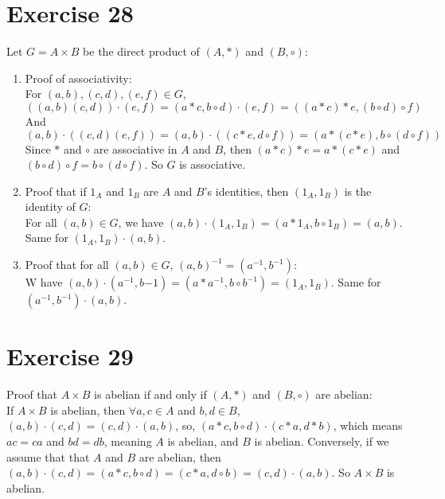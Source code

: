 \documentclass{article}
\begin{document}
    \section*{Exercise 28}
    Let $G = A \times B$ be the direct product of $(A, \ast)$ and $(B, \circ)$:
    \begin{enumerate}[label=\textbf{\alph*.}]
        \item 
            Proof of associativity: \\
            For $(a, b), (c, d), (e, f) \in G$,
            \[((a, b)(c, d)) \cdot (e, f)
            = (a \ast c, b \circ d) \cdot (e, f)
            = ((a \ast c) \ast e, (b \circ d) \circ f)\]
            And \[(a, b) \cdot ((c, d)(e, f))
            = (a, b) \cdot ((c \ast e, d \circ f))
            = (a \ast (c \ast e), b \circ (d \circ f))\]
            Since $\ast$ and $\circ$ are associative in $A$ and $B$,
            then $(a \ast c) \ast e = a \ast (c \ast e)$
            and $(b \circ d) \circ f = b \circ (d \circ f)$.
            So $G$ is associative.
        \item     
            Proof that if $1_A$ and $1_B$ are $A$ and $B$'s identities,
            then $(1_A, 1_B)$ is the identity of $G$: \\
            For all $(a, b) \in G$,
            we have $(a, b) \cdot (1_A, 1_B)
            = (a \ast 1_A, b \circ 1_B)
            = (a, b)$.
            Same for $(1_A, 1_B) \cdot (a, b)$.
        \item 
            Proof that for all $(a, b) \in G$,
            $(a, b)^{-1} = (a^{-1}, b^{-1})$: \\
            W have $(a, b) \cdot (a^{-1}, b{-1})
            = (a \ast a^{-1}, b \circ b^{-1})
            = (1_A, 1_B)$.
            Same for $(a^{-1}, b^{-1}) \cdot (a, b)$.
    \end{enumerate}


    \section*{Exercise 29}
    Proof that $A \times B$ is abelian
    if and only if $(A, \ast)$ and $(B, \circ)$ are abelian: \\
    If $A \times B $ is abelian,
    then $\forall a, c \in A$ and $b, d \in B$,
    $(a, b) \cdot (c, d) = (c, d) \cdot (a, b)$,
    so, $(a \ast c, b \circ d) \cdot (c \ast a, d \ast b)$,
    which means $ac = ca$ and $bd = db$,
    meaning $A$ is abelian, and $B$ is abelian.
    Conversely, if we assume that that $A$ and $B$ are abelian, 
    then $(a, b) \cdot (c, d)
    = (a \ast c, b \circ d)
    = (c \ast a, d \circ b)
    = (c, d) \cdot (a, b)$.
    So $A \times B$ is abelian. 
\end{document}
